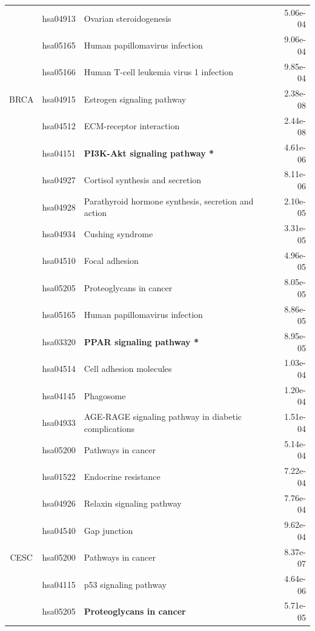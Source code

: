 \begin{longtable}{cllr}
 & hsa04913 & \textcolor{\clrnew}{Ovarian steroidogenesis} & 5.06e-04 \\ 
 & hsa05165 & \textcolor{\clrnew}{Human papillomavirus infection} & 9.06e-04 \\ 
 & hsa05166 & \textcolor{\clrnew}{Human T-cell leukemia virus 1 infection} & 9.85e-04 \\ 
\midrule 
BRCA & hsa04915 & \textcolor{\clrnew}{Estrogen signaling pathway} & 2.38e-08\\ 
 \rowcolor{\clrmatch}& hsa04512 & ECM-receptor interaction & 2.44e-08 \\ 
 \rowcolor{\clrpath}& hsa04151 & \textbf{PI3K-Akt signaling pathway *} & 4.61e-06 \\ 
 & hsa04927 & \textcolor{\clrnew}{Cortisol synthesis and secretion} & 8.11e-06 \\ 
 & hsa04928 & \textcolor{\clrnew}{Parathyroid hormone synthesis, secretion and action} & 2.10e-05 \\ 
 & hsa04934 & \textcolor{\clrnew}{Cushing syndrome} & 3.31e-05 \\ 
 \rowcolor{\clrmatch}& hsa04510 & Focal adhesion & 4.96e-05 \\ 
 & hsa05205 & \textcolor{\clrnew}{Proteoglycans in cancer} & 8.05e-05 \\ 
 & hsa05165 & \textcolor{\clrnew}{Human papillomavirus infection} & 8.86e-05 \\ 
 \rowcolor{\clrpath}& hsa03320 & \textbf{PPAR signaling pathway *} & 8.95e-05 \\ 
 & hsa04514 & \textcolor{\clrnew}{Cell adhesion molecules} & 1.03e-04 \\ 
 & hsa04145 & \textcolor{\clrnew}{Phagosome} & 1.20e-04 \\ 
 & hsa04933 & \textcolor{\clrnew}{AGE-RAGE signaling pathway in diabetic complications} & 1.51e-04 \\ 
 & hsa05200 & \textcolor{\clrnew}{Pathways in cancer} & 5.14e-04 \\ 
 & hsa01522 & \textcolor{\clrnew}{Endocrine resistance} & 7.22e-04 \\ 
 & hsa04926 & \textcolor{\clrnew}{Relaxin signaling pathway} & 7.76e-04 \\ 
 & hsa04540 & \textcolor{\clrnew}{Gap junction} & 9.62e-04 \\ 
\midrule 
CESC & hsa05200 & \textcolor{\clrnew}{Pathways in cancer} & 8.37e-07\\ 
 & hsa04115 & \textcolor{\clrnew}{p53 signaling pathway} & 4.64e-06 \\ 
 \rowcolor{\clrpath}& hsa05205 & \textbf{Proteoglycans in cancer} & 5.71e-05 \\ 

\end{longtable}

